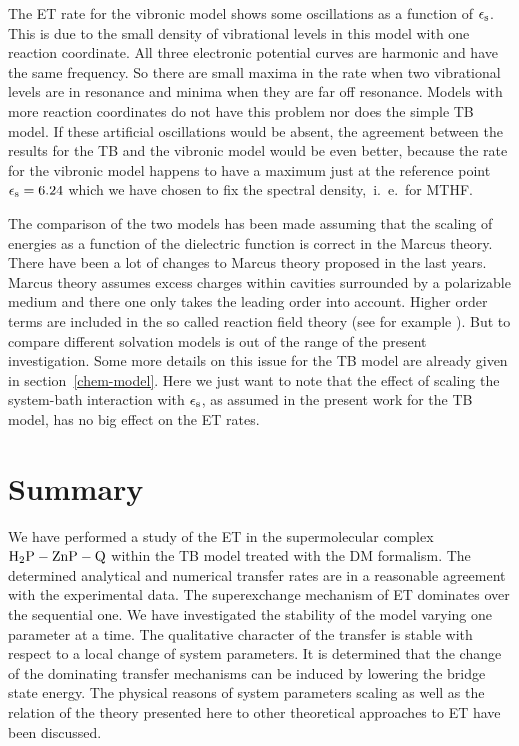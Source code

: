 \documentclass[12pt,twoside,a4paper]{report}
\begin{document}
The ET rate for the vibronic model shows some oscillations as a function of
$\epsilon_{\rm s}$. This is due to the small density of vibrational levels
in this model with one reaction coordinate. 
%
%
All three electronic potential
curves are harmonic and have the same frequency.  So there are small maxima
in the rate when two vibrational levels are in resonance and minima when
they are far off resonance. Models with more reaction coordinates do not
have this problem nor does the simple TB model. If these
artificial oscillations would be absent, the agreement between the results
for the TB and the vibronic model would be even better, because
the rate for the vibronic model happens to have a maximum just at the
reference point $\epsilon_{\rm s}=6.24$ which we have chosen 
to fix the spectral density,~i.~e.~for MTHF. 



The comparison of the two models has been made assuming that the scaling of
energies as a function of the dielectric function is correct in the Marcus
theory. There have been a lot of changes to Marcus theory proposed in the
last years.  Marcus theory assumes excess charges within cavities
surrounded by a polarizable medium and there one only takes the leading
order into account.  Higher order terms are included in the so called
reaction field theory (see for example \cite{Karelson}). But to compare
different solvation models is out of the range of the present
investigation.  Some more details on this issue for the TB model
are already given in 
section~\ref{chem-model}.
Here we just want to note  that the
effect of scaling the system-bath interaction with $\epsilon_{\rm s}$, as
assumed in the present work for the TB model, has no big effect
on the ET rates.

\section{Summary}
We have performed a study of the ET in the
supermolecular complex ${\rm H_2P}-{\rm ZnP}-{\rm Q}$ within 
the TB model treated with
the DM formalism.
The determined analytical and numerical transfer rates are in
a reasonable agreement with the experimental data.  The
superexchange mechanism of ET dominates over the
sequential one.  We have investigated the stability of the model
varying one parameter at a time.  The
qualitative character of the transfer is stable with respect to a
local change of system parameters.  It is determined that the
change of the dominating
transfer mechanisms can be induced by
lowering the bridge state energy.  
The physical reasons of system parameters scaling
as well
as the relation of the theory
presented here to other theoretical approaches to ET
have been discussed.
\end{document}
